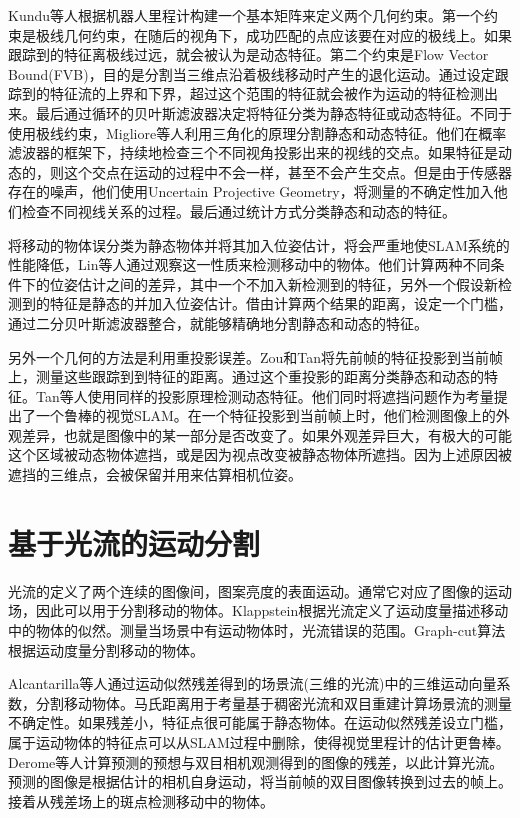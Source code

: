 Kundu等人\cite{kundu2009movingA}根据机器人里程计构建一个基本矩阵来定义两个几何约束。第一个约束是极线几何约束，在随后的视角下，成功匹配的点应该要在对应的极线上。如果跟踪到的特征离极线过远，就会被认为是动态特征。第二个约束是Flow Vector Bound(FVB)，目的是分割当三维点沿着极线移动时产生的退化运动。通过设定跟踪到的特征流的上界和下界，超过这个范围的特征就会被作为运动的特征检测出来。最后通过循环的贝叶斯滤波器决定将特征分类为静态特征或动态特征。不同于使用极线约束，Migliore等人\cite{Migliore2009Use}利用三角化的原理分割静态和动态特征。他们在概率滤波器的框架下，持续地检查三个不同视角投影出来的视线的交点。如果特征是动态的，则这个交点在运动的过程中不会一样，甚至不会产生交点。但是由于传感器存在的噪声，他们使用Uncertain Projective Geometry\cite{Heuel2001Matching}，将测量的不确定性加入他们检查不同视线关系的过程。最后通过统计方式分类静态和动态的特征。

将移动的物体误分类为静态物体并将其加入位姿估计，将会严重地使SLAM系统的性能降低，Lin等人\cite{Wang2007Simultaneous}通过观察这一性质来检测移动中的物体。他们计算两种不同条件下的位姿估计之间的差异，其中一个不加入新检测到的特征，另外一个假设新检测到的特征是静态的并加入位姿估计。借由计算两个结果的距离，设定一个门槛，通过二分贝叶斯滤波器整合，就能够精确地分割静态和动态的特征。

另外一个几何的方法是利用重投影误差。Zou和Tan\cite{Danping2013CoSLAM}将先前帧的特征投影到当前帧上，测量这些跟踪到到特征的距离。通过这个重投影的距离分类静态和动态的特征。Tan等人\cite{Wei2013Robust}使用同样的投影原理检测动态特征。他们同时将遮挡问题作为考量提出了一个鲁棒的视觉SLAM。在一个特征投影到当前帧上时，他们检测图像上的外观差异，也就是图像中的某一部分是否改变了。如果外观差异巨大，有极大的可能这个区域被动态物体遮挡，或是因为视点改变被静态物体所遮挡。因为上述原因被遮挡的三维点，会被保留并用来估算相机位姿。

\section{基于光流的运动分割}
光流的定义了两个连续的图像间，图案亮度的表面运动\cite{Horn1980Determining}。通常它对应了图像的运动场，因此可以用于分割移动的物体。Klappstein\cite{Klappstein2008Moving}根据光流定义了运动度量描述移动中的物体的似然。测量当场景中有运动物体时，光流错误的范围。Graph-cut算法根据运动度量分割移动的物体。

Alcantarilla等人\cite{Alcantarilla2012On}通过运动似然残差得到的场景流(三维的光流)中的三维运动向量系数，分割移动物体。马氏距离用于考量基于稠密光流和双目重建计算场景流的测量不确定性。如果残差小，特征点很可能属于静态物体。在运动似然残差设立门槛，属于运动物体的特征点可以从SLAM过程中删除，使得视觉里程计的估计更鲁棒。Derome等人\cite{Derome2015Moving, Derome2014Real}计算预测的预想与双目相机观测得到的图像的残差，以此计算光流。预测的图像是根据估计的相机自身运动，将当前帧的双目图像转换到过去的帧上。接着从残差场上的斑点检测移动中的物体。


